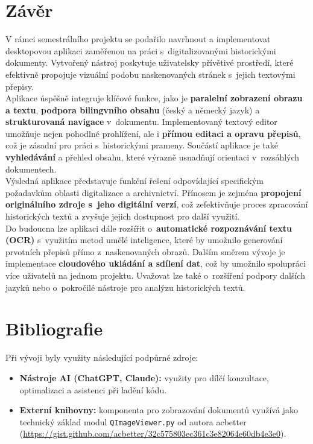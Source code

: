 \documentclass[FM,Proj]{tulthesis}
\begin{document}
		
\chapter{Závěr}

V rámci semestrálního projektu se podařilo navrhnout a implementovat desktopovou aplikaci zaměřenou na práci s~digitalizovanými historickými dokumenty. Vytvořený nástroj poskytuje uživatelsky přívětivé prostředí, které efektivně propojuje vizuální podobu naskenovaných stránek s~jejich textovými přepisy. \\[6pt]

Aplikace úspěšně integruje klíčové funkce, jako je \textbf{paralelní zobrazení obrazu a textu}, \textbf{podpora bilingvního obsahu} (český a německý jazyk) a \textbf{strukturovaná navigace} v~dokumentu. Implementovaný textový editor umožňuje nejen pohodlné prohlížení, ale i \textbf{přímou editaci a opravu přepisů}, což je zásadní pro práci s~historickými prameny. Součástí aplikace je také \textbf{vyhledávání} a přehled obsahu, které výrazně usnadňují orientaci v~rozsáhlých dokumentech. \\[6pt]

Výsledná aplikace představuje funkční řešení odpovídající specifickým požadavkům oblasti digitalizace a archivnictví. Přínosem je zejména \textbf{propojení originálního zdroje s~jeho digitální verzí}, což zefektivňuje proces zpracování historických textů a zvyšuje jejich dostupnost pro další využití. \\[6pt]

Do budoucna lze aplikaci dále rozšířit o~\textbf{automatické rozpoznávání textu (OCR)} s~využitím metod umělé inteligence, které by umožnilo generování prvotních přepisů přímo z~naskenovaných obrazů. Dalším směrem vývoje je implementace \textbf{cloudového ukládání a sdílení dat}, což by umožnilo spolupráci více uživatelů na jednom projektu. Uvažovat lze také o~rozšíření podpory dalších jazyků nebo o~pokročilé nástroje pro analýzu historických textů.
	
\chapter{Bibliografie}

Při vývoji byly využity následující podpůrné zdroje:

\begin{itemize}
	\item \textbf{Nástroje AI (ChatGPT, Claude):} využity pro dílčí konzultace, optimalizaci a asistenci při ladění kódu.
	\item \textbf{Externí knihovny:} komponenta pro zobrazování dokumentů využívá jako technický základ modul \texttt{QImageViewer.py} od autora acbetter (\url{https://gist.github.com/acbetter/32c575803ec361c3e82064e60db4e3e0}).
\end{itemize}


		
	
\end{document}
